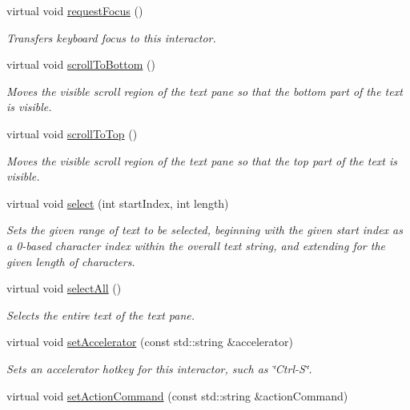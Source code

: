 \begin{DoxyCompactItemize}
virtual void \mbox{\hyperlink{classGInteractor_a519fb2ac767f8b2febbb50b898b8c8cb}{request\+Focus}} ()
\begin{DoxyCompactList}\small\item\em Transfers keyboard focus to this interactor. \end{DoxyCompactList}\item 
virtual void \mbox{\hyperlink{classGBrowserPane_ad4c9b6140b529865a6cdeed37a339237}{scroll\+To\+Bottom}} ()
\begin{DoxyCompactList}\small\item\em Moves the visible scroll region of the text pane so that the bottom part of the text is visible. \end{DoxyCompactList}\item 
virtual void \mbox{\hyperlink{classGBrowserPane_a9eacfcf7c186936ed957dd1c8a9c6b64}{scroll\+To\+Top}} ()
\begin{DoxyCompactList}\small\item\em Moves the visible scroll region of the text pane so that the top part of the text is visible. \end{DoxyCompactList}\item 
virtual void \mbox{\hyperlink{classGBrowserPane_aaeb1320c0553d0d2b8081b750f59a34a}{select}} (int start\+Index, int length)
\begin{DoxyCompactList}\small\item\em Sets the given range of text to be selected, beginning with the given start index as a 0-\/based character index within the overall text string, and extending for the given length of characters. \end{DoxyCompactList}\item 
virtual void \mbox{\hyperlink{classGBrowserPane_ab6658ed404200bd7aaca5629db064645}{select\+All}} ()
\begin{DoxyCompactList}\small\item\em Selects the entire text of the text pane. \end{DoxyCompactList}\item 
virtual void \mbox{\hyperlink{classGInteractor_ad15f102f62e2960576012f1aa0ba4b2e}{set\+Accelerator}} (const std\+::string \&accelerator)
\begin{DoxyCompactList}\small\item\em Sets an accelerator hotkey for this interactor, such as \char`\"{}\+Ctrl-\/\+S\char`\"{}. \end{DoxyCompactList}\item 
virtual void \mbox{\hyperlink{classGInteractor_a4b5843fe3030e038a1ba54cc03389bcf}{set\+Action\+Command}} (const std\+::string \&action\+Command)

\end{DoxyCompactItemize}
